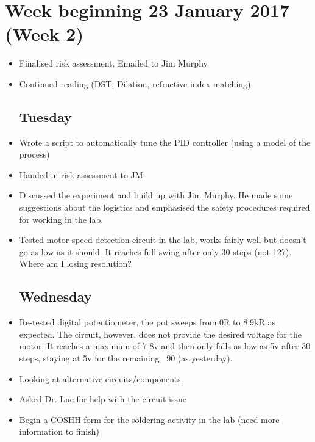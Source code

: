 \documentclass[a4]{report}
\begin{document}
	\section{Week beginning 23 January 2017 (Week 2)}
	\begin{itemize}
		\subsection*{Monday}
		\item Finalised risk assessment, Emailed to Jim Murphy
		\item Continued reading (DST, Dilation, refractive index matching)
		\subsection*{Tuesday}
		\item Wrote a script to automatically tune the PID controller (using a model of the process)
		\item Handed in risk assessment to JM
		\item Discussed the experiment and build up with Jim Murphy. He made some suggestions about the logistics and emphasised the safety procedures required for working in the lab.
		\item Tested motor speed detection circuit in the lab, works fairly well but doesn't go as low as it should. It reaches full swing after only 30 steps (not 127). Where am I losing resolution?
		\subsection*{Wednesday}
		\item Re-tested digital potentiometer, the pot sweeps from 0R to 8.9kR as expected. The circuit, however, does not provide the desired voltage for the motor. It reaches a maximum of 7-8v and then only falls as low as 5v after 30 steps, staying at 5v for the remaining ~90 (as yesterday).
		\item Looking at alternative circuits/components.
		\item Asked Dr. Lue for help with the circuit issue
		\item Begin a COSHH form for the soldering activity in the lab (need more information to finish)
		

	\end{itemize}
	\newpage
\end{document}
